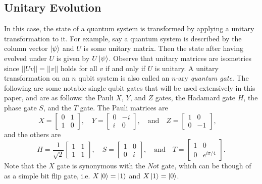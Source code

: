 \documentclass[12pt]{dalthesis}
\begin{document}
\subsection{Unitary Evolution}
In this case, the state of a quantum system is transformed by applying a unitary transformation to it. For example, say a quantum system is described by the column vector $\ket{\psi}$ and $U$ is some unitary matrix. Then the state after having evolved under $U$ is given by $U \ket{\psi}$. Observe that unitary matrices are isometries since $||Uv|| = ||v||$ holds for all $v$ if and only if $U$ is unitary. A unitary transformation on an $n$ qubit system is also called an $n$-ary \emph{quantum gate}. The following are some notable single qubit gates that will be used extensively in this paper, and are as follows: the Pauli $X$, $Y$, and $Z$ gates, the Hadamard gate $H$, the phase gate $S$, and the $T$ gate. The Pauli matrices are 
\begin{equation*}
  X = \begin{bmatrix}
    0 & 1 \\
    1 & 0
  \end{bmatrix}, \quad
  Y = \begin{bmatrix}
  0 & -i \\
  i & 0
  \end{bmatrix}, \quad \mbox{and} \quad
  Z = \begin{bmatrix}
  1 & 0 \\
  0 & -1
  \end{bmatrix}, \quad
\end{equation*}
and the others are
\begin{equation*}
  H = \frac{1}{\sqrt{2}} \begin{bmatrix}
  1 & 1 \\
  1 & 1
  \end{bmatrix}, \quad
  S = \begin{bmatrix}
  1 & 0 \\
  0 & i
  \end{bmatrix}, \quad \mbox{and} \quad
  T = \begin{bmatrix}
  1 & 0 \\
  0 & e^{i \pi /4}
  \end{bmatrix}.
\end{equation*}
Note that the $X$ gate is synonymous with the $Not$ gate, which can be though of as a simple bit flip gate, i.e. $X\ket{0} = \ket{1}$ and $X\ket{1} = \ket{0}$.
\end{document}
